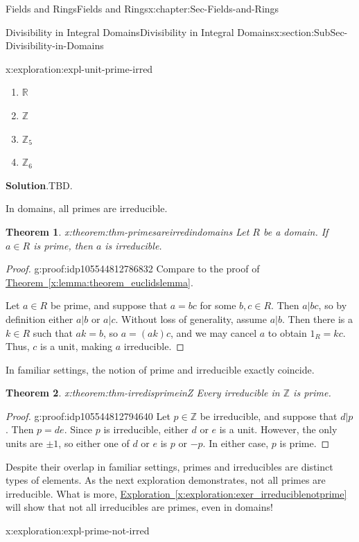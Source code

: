 \documentclass[oneside,10pt,]{book}
\newcommand{\blocktitlefont}{\relax}
\newcommand{\xreffont}{\relax}
\numberwithin{equation}{section}
\def\Z{{\mathbb Z}}
\def\R{{\mathbb R}}
\newtheorem{theorem}{Theorem}[section]
\begin{document}
\begin{chapterptx}{Fields and Rings}{}{Fields and Rings}{}{}{x:chapter:Sec-Fields-and-Rings}
\begin{sectionptx}{Divisibility in Integral Domains}{}{Divisibility in Integral Domains}{}{}{x:section:SubSec-Divisibility-in-Domains}
\begin{exploration}{}{x:exploration:expl-unit-prime-irred}
%
\begin{enumerate}
\item{}\(\displaystyle \R\)%
\item{}\(\displaystyle \Z\)%
\item{}\(\displaystyle \Z_{5}\)%
\item{}\(\displaystyle \Z_6\)%
\end{enumerate}
\par\smallskip%
\noindent\textbf{\blocktitlefont Solution}.\hypertarget{g:solution:idp105544812784400}{}\quad{}TBD.%
\end{exploration}%
In domains, all primes are irreducible.%
\begin{theorem}{}{}{x:theorem:thm-primesareirredindomains}%
Let \(R\) be a domain. If \(a\in R\) is prime, then \(a\) is irreducible.%
\end{theorem}
\begin{proof}{}{g:proof:idp105544812786832}
Compare to the proof of \hyperref[x:lemma:theorem_euclidslemma]{Theorem~{\xreffont\ref{x:lemma:theorem_euclidslemma}}}.%
\par
Let \(a\in R\) be prime, and suppose that \(a = bc\) for some \(b,c\in R\). Then \(a|bc\), so by definition either \(a|b\) or \(a|c\). Without loss of generality, assume \(a|b\). Then there is a \(k\in R\) such that \(ak=b\), so \(a = (ak)c\), and we may cancel \(a\) to obtain \(1_R = kc\). Thus, \(c\) is a unit, making \(a\) irreducible.%
\end{proof}
In familiar settings, the notion of prime and irreducible exactly coincide.%
\begin{theorem}{}{}{x:theorem:thm-irredisprimeinZ}%
Every irreducible in \(\Z\) is prime.%
\end{theorem}
\begin{proof}{}{g:proof:idp105544812794640}
Let \(p\in \Z\) be irreducible, and suppose that \(d|p\). Then \(p = de\). Since \(p\) is irreducible, either \(d\) or \(e\) is a unit. However, the only units are \(\pm 1\), so either one of \(d\) or \(e\) is \(p\) or \(-p\). In either case, \(p\) is prime.%
\end{proof}
Despite their overlap in familiar settings, primes and irreducibles are distinct types of elements. As the next exploration demonstrates, not all primes are irreducible. What is more, \hyperref[x:exploration:exer_irreduciblenotprime]{Exploration~{\xreffont\ref{x:exploration:exer_irreduciblenotprime}}} will show that not all irreducibles are primes, even in domains!%
\begin{exploration}{}{x:exploration:expl-prime-not-irred}%

\end{exploration}
\end{sectionptx}
\end{chapterptx}
\end{document}
